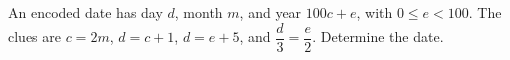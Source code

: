 An encoded date has day $d$, month $m$, and year $100c+e$, with $0\le e<100$. The clues are $c=2m$, $d=c+1$, $d=e+5$, and $\dfrac{d}{3}=\dfrac{e}{2}$. Determine the date.
